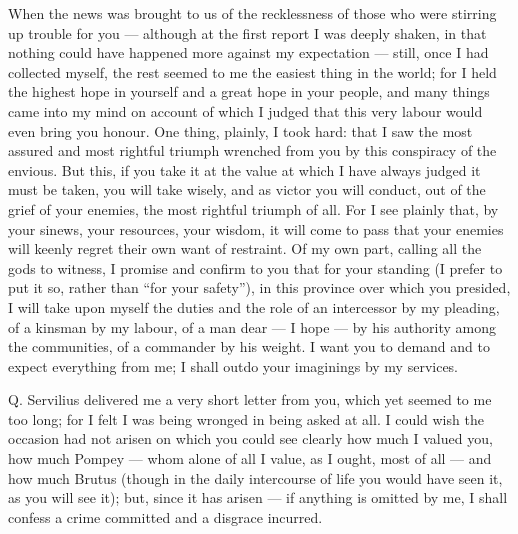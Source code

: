 

 When the news was brought to us of the recklessness of those who were stirring up trouble for you --- although at the first report I was deeply shaken, in that nothing could have happened more against my expectation --- still, once I had collected myself, the rest seemed to me the easiest thing in the world; for I held the highest hope in yourself and a great hope in your people, and many things came into my mind on account of which I judged that this very labour would even bring you honour. One thing, plainly, I took hard: that I saw the most assured and most rightful triumph wrenched from you by this conspiracy of the envious. But this, if you take it at the value at which I have always judged it must be taken, you will take wisely, and as victor you will conduct, out of the grief of your enemies, the most rightful triumph of all. For I see plainly that, by your sinews, your resources, your wisdom, it will come to pass that your enemies will keenly regret their own want of restraint. Of my own part, calling all the gods to witness, I promise and confirm to you that for your standing (I prefer to put it so, rather than ``for your safety''), in this province over which you presided, I will take upon myself the duties and the role of an intercessor by my pleading, of a kinsman by my labour, of a man dear --- I hope --- by his authority among the communities, of a commander by his weight. I want you to demand and to expect everything from me; I shall outdo your imaginings by my services.

 Q. Servilius delivered me a very short letter from you, which yet seemed to me too long; for I felt I was being wronged in being asked at all. I could wish the occasion had not arisen on which you could see clearly how much I valued you, how much Pompey --- whom alone of all I value, as I ought, most of all --- and how much Brutus (though in the daily intercourse of life you would have seen it, as you will see it); but, since it has arisen --- if anything is omitted by me, I shall confess a crime committed and a disgrace incurred.

